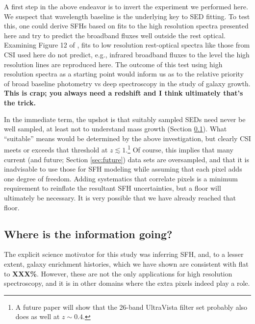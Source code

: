 \documentclass[a4paper,fleqn,usenatbib]{mnras}
\newcommand{\bfr}{\bf\color{red}}
\begin{document}
A first step in the above endeavor is to invert the experiment we performed here. We suspect 
that wavelength baseline is the underlying key to SED fitting. To test this, one could derive
SFHs based on fits to the high resolution spectra presented here and try to predict the broadband
fluxes well outside the rest optical. Examining Figure 12 of \citet{Abramson20}, fits to
low resolution rest-optical spectra like those from CSI used here do not predict, e.g., infrared
broadband fluxes to the level the high resolution lines are reproduced here. The outcome of
this test using high resolution spectra as a starting point would inform us as to the relative
priority of broad baseline photometry vs deep spectroscopy in the study of galaxy growth. 
{\bfr This is crap; you always need a redshift and I think ultimately that's the trick.}

In the immediate term, the upshot is that suitably sampled SEDs need never be well sampled, at least
not to understand mass growth (Section \ref{sec:redshifts}). What ``suitable'' means would be determined 
by the above investigation, but clearly CSI meets or exceeds that threshold at $z\lesssim1$.\footnote{A future 
paper will show that the 26-band UltraVista filter set \citep{Muzzin13} probably also does as well at 
$z\sim0.4$.} Of course, this implies that many current (and future; Section \ref{sec:future}) data sets 
are oversampled, and that it is inadvisable to use those for SFH modeling while assuming that each 
pixel adds one degree of freedom. Adding systematics that correlate pixels is a minimum requirement 
to reinflate the resultant SFH uncertainties, but a floor will ultimately be necessary. It is very possible 
that we have already reached that floor.

\subsection{Where is the information going?}
\label{sec:redshifts}

The explicit science motivator for this study was inferring SFH, and, to a lesser extent, galaxy 
enrichment histories, which we have shown are consistent with flat to {\bfr XXX\%}. However, 
these are not the only applications for high resolution spectroscopy, and it is in other domains 
where the extra pixels indeed play a role.
\end{document}
